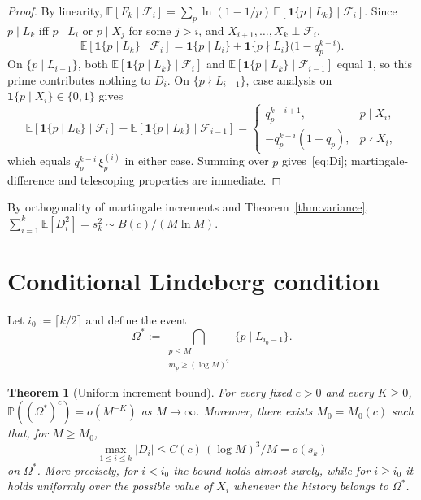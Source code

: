 \documentclass[11pt]{article}
\newtheorem{theorem}{Theorem}
\theoremstyle{remark}
\newcommand{\PP}{\mathbb{P}}
\newcommand{\EE}{\mathbb{E}}
\newcommand{\F}{\mathcal{F}}
\newcommand{\one}{\mathbf{1}}
\begin{document}
\begin{proof}
By linearity, $\EE[F_k \mid \F_i] = \sum_p \ln(1 - 1/p)\, \EE[\one\{p \mid L_k\} \mid \F_i]$. Since $p \mid L_k$ iff $p \mid L_i$ or $p \mid X_j$ for some $j > i$, and $X_{i+1}, \ldots, X_k \perp \F_i$,
\[
\EE[\one\{p \mid L_k\} \mid \F_i] = \one\{p \mid L_i\} + \one\{p \nmid L_i\}\bigl(1 - q_p^{k-i}\bigr).
\]
On $\{p \mid L_{i-1}\}$, both $\EE[\one\{p \mid L_k\} \mid \F_i]$ and $\EE[\one\{p \mid L_k\} \mid \F_{i-1}]$ equal $1$, so this prime contributes nothing to $D_i$. On $\{p \nmid L_{i-1}\}$, case analysis on $\one\{p \mid X_i\} \in \{0, 1\}$ gives
\[
\EE[\one\{p \mid L_k\} \mid \F_i] - \EE[\one\{p \mid L_k\} \mid \F_{i-1}] = \begin{cases} q_p^{k-i+1}, & p \mid X_i, \\ -q_p^{k-i}(1 - q_p), & p \nmid X_i, \end{cases}
\]
which equals $q_p^{k-i}\, \xi_p^{(i)}$ in either case. Summing over $p$ gives~\eqref{eq:Di}; martingale-difference and telescoping properties are immediate.
\end{proof}

By orthogonality of martingale increments and Theorem~\ref{thm:variance}, $\sum_{i=1}^k \EE[D_i^2] = s_k^2 \sim B(c)/(M \ln M)$.

\section{Conditional Lindeberg condition}\label{sec:lindeberg}

Let $i_0 := \lceil k/2\rceil$ and define the event
\[
\Omega^* := \bigcap_{\substack{p \leq M \\ m_p \geq (\log M)^2}} \{p \mid L_{i_0-1}\}.
\]

\begin{theorem}[Uniform increment bound]\label{thm:supnorm}
For every fixed $c > 0$ and every $K \geq 0$, $\PP((\Omega^*)^c) = o(M^{-K})$ as $M \to \infty$. Moreover, there exists $M_0 = M_0(c)$ such that, for $M \geq M_0$,
\begin{equation}\label{eq:supnorm}
\max_{1 \leq i \leq k}|D_i| \leq C(c)\,(\log M)^3/M = o(s_k)
\end{equation}
on $\Omega^*$. More precisely, for $i < i_0$ the bound holds almost surely, while for $i \geq i_0$ it holds uniformly over the possible value of $X_i$ whenever the history belongs to $\Omega^*$.
\end{theorem}
\end{document}
